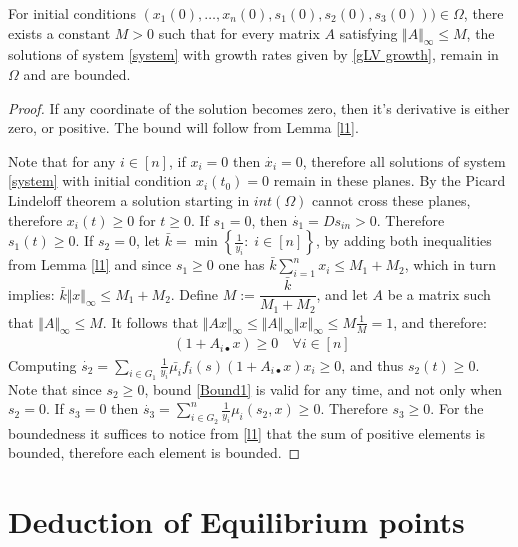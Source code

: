 \documentclass[processes,article,submit,moreauthors,pdftex]{Definitions/mdpi}
\begin{document}
\begin{Lemma}
	For initial conditions $(x_1(0),\dots,x_n(0),s_1(0),s_2(0),s_3(0)))\in \Omega$, there exists a constant $M>0$ such that for every matrix $A$ satisfying $\Vert A \Vert_{\infty} \leq M $, the solutions of system \eqref{system} with growth rates given by \eqref{gLV growth}, remain in $\Omega$ and are bounded.
\end{Lemma}

\begin{proof}
	If any coordinate of the solution becomes zero, then it's derivative is either zero, or positive. The bound will follow from Lemma \ref{l1}.
	
	Note that for any $i \in [n] $, if $x_i = 0$ then $\dot{x_{i}} = 0$, therefore all solutions of system \eqref{system} with initial condition $x_i(t_0) = 0$ remain in these planes. By the Picard Lindeloff theorem a solution starting in $int(\Omega)$ cannot cross these planes, therefore $x_i(t)\geq 0$ for $t \geq 0$. If $s_1 = 0$, then $\dot{s_1} = Ds_{in} > 0$. Therefore $s_1(t) \geq 0$.
	If $s_2 = 0$, let $\bar{k} = \min \left\{ \frac{1}{y_i}  : \; i\in [n] \right \}$, by adding both inequalities from Lemma \eqref{l1} and since $s_1\geq 0$ one has $\bar{k} \sum  \limits_{i = 1}^{n}   x_i  \leq M_1 + M_2  $, which in turn implies: $ \bar{k} \Vert x \Vert_{\infty} \leq M_1 + M_2$. Define $M := \dfrac{\bar{k}}{M_1 + M_2}$, and let $A$ be a matrix such that $\Vert A \Vert_{\infty} \leq M$. It follows that $\Vert Ax \Vert_{\infty} \leq \Vert A \Vert_{\infty} \Vert x\Vert_{\infty} \leq M \frac{1}{M} = 1$, and therefore:
	\begin{align}
	\label{Bound1}  \;   (1 + A_{i\bullet}x) \geq 0  \quad \forall i \in [n]
	\end{align} 
	Computing $\dot{s_2} = \sum \limits_{i \in G_1 } \frac{1}{y_i}\bar{\mu_i}f_i(s)(1+A_{i \bullet }x)x_i \geq 0$, and thus $s_2(t) \geq 0$.
	Note that since $s_2 \geq 0$, bound \eqref{Bound1} is valid for any time, and not only when $s_2 = 0$. If $s_3 = 0$ then $\dot{s_3} = \sum \limits_{i \in G_2 }^{n}\frac{1}{y_i}\mu_i(s_2,x)\geq 0$. Therefore $s_3 \geq 0$.	For the boundedness it suffices to notice from \cref{l1} that the sum of positive elements is bounded, therefore each element is bounded.
\end{proof}

\section{Deduction of  Equilibrium points}
\end{document}
